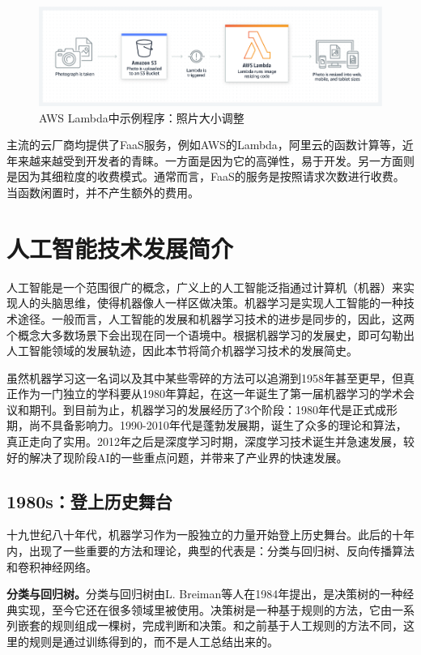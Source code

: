\begin{figure}
    \centerline{\includegraphics[width=\textwidth]{figures/aws-lambda-resize.png}}
    \caption{AWS Lambda中示例程序：照片大小调整}
    \label{aws_resize}
\end{figure}

主流的云厂商均提供了FaaS服务，例如AWS的Lambda，阿里云的函数计算等，近年来越来越受到开发者的青睐。一方面是因为它的高弹性，易于开发。另一方面则是因为其细粒度的收费模式。通常而言，FaaS的服务是按照请求次数进行收费。当函数闲置时，并不产生额外的费用。

\section{人工智能技术发展简介}\label{sec_ml_history}
人工智能是一个范围很广的概念，广义上的人工智能泛指通过计算机（机器）来实现人的头脑思维，使得机器像人一样区做决策。机器学习是实现人工智能的一种技术途径。一般而言，人工智能的发展和机器学习技术的进步是同步的，因此，这两个概念大多数场景下会出现在同一个语境中。根据机器学习的发展史，即可勾勒出人工智能领域的发展轨迹，因此本节将简介机器学习技术的发展简史。

虽然机器学习这一名词以及其中某些零碎的方法可以追溯到1958\parencite{samuel1995some}年甚至更早，但真正作为一门独立的学科要从1980年算起，在这一年诞生了第一届机器学习的学术会议和期刊。到目前为止，机器学习的发展经历了3个阶段：1980年代是正式成形期，尚不具备影响力。1990-2010年代是蓬勃发展期，诞生了众多的理论和算法，真正走向了实用。2012年之后是深度学习时期，深度学习技术诞生并急速发展，较好的解决了现阶段AI的一些重点问题，并带来了产业界的快速发展。

\subsection{1980s：登上历史舞台}
十九世纪八十年代，机器学习作为一股独立的力量开始登上历史舞台。此后的十年内，出现了一些重要的方法和理论，典型的代表是：分类与回归树\parencite{breiman1983classification}、反向传播算法\parencite{rumelhart1986learning}和卷积神经网络\parencite{lecun1989backpropagation}。

\textbf{分类与回归树。}分类与回归树由L. Breiman等人在1984年提出，是决策树的一种经典实现，至今它还在很多领域里被使用。决策树是一种基于规则的方法，它由一系列嵌套的规则组成一棵树，完成判断和决策。和之前基于人工规则的方法不同，这里的规则是通过训练得到的，而不是人工总结出来的。

